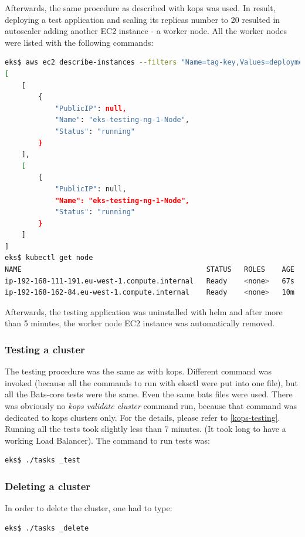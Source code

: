 Afterwards, the same procedure as described with kops was used. In result, deploying a test application and scaling its replicas number to 20 resulted in autoscaler adding another EC2 instance - a worker node. All the worker nodes were listed with the following commands:
\begin{lstlisting}[basicstyle=\tiny,caption={TODO},captionpos=b,language=Bash,xleftmargin=1cm]
eks$ aws ec2 describe-instances --filters "Name=tag-key,Values=deployment" --query "Reservations[*].Instances[*].{PublicIP:PublicIpAddress,Name:Tags[?Key=='Name']|[0].Value,Status:State.Name}"
[
    [
        {
            "PublicIP": null,
            "Name": "eks-testing-ng-1-Node",
            "Status": "running"
        }
    ],
    [
        {
            "PublicIP": null,
            "Name": "eks-testing-ng-1-Node",
            "Status": "running"
        }
    ]
]
eks$ kubectl get node
NAME                                            STATUS   ROLES    AGE   VERSION
ip-192-168-111-191.eu-west-1.compute.internal   Ready    <none>   67s   v1.16.8-eks-e16311
ip-192-168-162-84.eu-west-1.compute.internal    Ready    <none>   10m   v1.16.8-eks-e16311
\end{lstlisting}
Afterwards, the testing application was uninstalled with helm and after more than 5 minutes, the worker node EC2 instance was automatically removed.

\subsubsection{Testing a cluster}
The testing procedure was the same as with kops. Different command was invoked (because all the commands to run with eksctl were put into one file), but all the Bats-core tests were the same. Even the same bats files were used. There was obviously no \textit{kops validate cluster} command run, because that command was dedicated to kops clusters only. For the details, please refer to \ref{kops-testing}. Running all the tests took slightly less than 7 minutes. (It took long to have a working Load Balancer). The command to run tests was:
\begin{lstlisting}[basicstyle=\tiny,caption={TODO},captionpos=b,language=Bash,xleftmargin=1cm]
eks$ ./tasks _test
\end{lstlisting}

\subsubsection{Deleting a cluster}
In order to delete the cluster, one had to type:
\begin{lstlisting}[basicstyle=\tiny,caption={TODO},captionpos=b,language=Bash,xleftmargin=1cm]
eks$ ./tasks _delete
\end{lstlisting}

